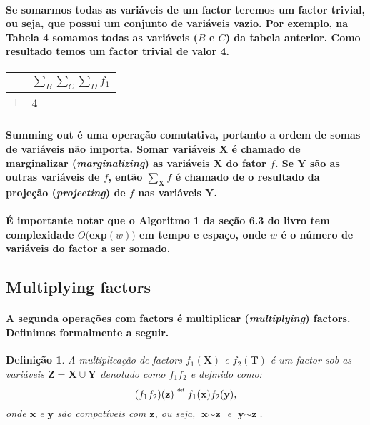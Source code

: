 \documentclass[a4paper,10pt]{article}
\newcommand\defeq{\mathrel{\overset{\makebox[0pt]{\mbox{\normalfont\tiny\sffamily def}}}{=}}}
\theoremstyle{plain}
\newtheorem*{spn-def}{Definição}
\begin{document}
\paragraph{
  Se somarmos todas as variáveis de um factor teremos um factor trivial, ou seja, que possui um
conjunto de variáveis vazio. Por exemplo, na Tabela 4 somamos todas as variáveis ($B$ e $C$) da
tabela anterior. Como resultado temos um factor trivial de valor 4.
}

\begin{table}[h]
\begin{center}
\begin{tabular}{c | l}
  & $\sum_B \sum_C \sum_D f_1$ \\
  \hline
  $\top$ & 4 \\
\end{tabular}
\end{center}
\end{table}

\paragraph{
  Summing out é uma operação comutativa, portanto a ordem de somas de variáveis não importa. Somar
variáveis $\textbf{X}$ é chamado de marginalizar (\textit{marginalizing}) as variáveis $\textbf{X}$
do fator $f$. Se $\textbf{Y}$ são as outras variáveis de $f$, então $\sum_{\textbf{X}} f$ é chamado
de o resultado da projeção (\textit{projecting}) de $f$ nas variáveis $\textbf{Y}$.
}

\paragraph{
  É importante notar que o Algoritmo 1 da seção 6.3 do livro tem complexidade $O($exp$(w))$ em 
tempo e espaço, onde $w$ é o número de variáveis do factor a ser somado.
}

\subsection{Multiplying factors}

\paragraph{
  A segunda operações com factors é multiplicar (\textit{multiplying}) factors. Definimos 
formalmente a seguir.
}

\begin{spn-def} A multiplicação de factors $f_1(\textbf{X})$ e $f_2(\textbf{T})$ é um factor sob
  as variáveis $\textbf{Z} = \textbf{X} \cup \textbf{Y}$ denotado como $f_1f_2$ e definido como:
  \begin{equation}
    (f_1f_2)(\textbf{z}) \defeq f_1(\textbf{x})f_2(\textbf{y}),
  \end{equation}
  onde $\textbf{x}$ e $\textbf{y}$ são compatíveis\cite{report-1} com $\textbf{z}$, ou seja, 
  $\textbf{x} \sim  \textbf{z}$ e $\textbf{y} \sim \textbf{z}$.
\end{spn-def}
\end{document}
